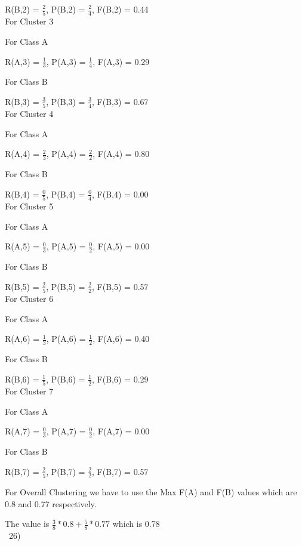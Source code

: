 \documentclass[12pt,english]{article}
\begin{document}
R(B,2) = $\frac{2}{5}$, P(B,2) = $\frac{2}{4}$, F(B,2) = 0.44\\
For Cluster 3\par                          
For Class A\par                            
R(A,3) = $\frac{1}{3}$, P(A,3) = $\frac{1}{4}$, F(A,3) = 0.29\par
For Class B\par                            
R(B,3) = $\frac{3}{5}$, P(B,3) = $\frac{3}{4}$, F(B,3) = 0.67\\
For Cluster 4\par                          
For Class A\par                            
R(A,4) = $\frac{2}{3}$, P(A,4) = $\frac{2}{2}$, F(A,4) = 0.80\par
For Class B\par                            
R(B,4) = $\frac{0}{5}$, P(B,4) = $\frac{0}{4}$, F(B,4) = 0.00\\
For Cluster 5\par                          
For Class A\par                            
R(A,5) = $\frac{0}{3}$, P(A,5) = $\frac{0}{2}$, F(A,5) = 0.00\par
For Class B\par                            
R(B,5) = $\frac{2}{5}$, P(B,5) = $\frac{2}{2}$, F(B,5) = 0.57\\
For Cluster 6\par                          
For Class A\par                            
R(A,6) = $\frac{1}{3}$, P(A,6) = $\frac{1}{2}$, F(A,6) = 0.40\par
For Class B\par                            
R(B,6) = $\frac{1}{5}$, P(B,6) = $\frac{1}{2}$, F(B,6) = 0.29\\
For Cluster 7\par                          
For Class A\par                            
R(A,7) = $\frac{0}{3}$, P(A,7) = $\frac{0}{2}$, F(A,7) = 0.00\par
For Class B\par                            
R(B,7) = $\frac{2}{5}$, P(B,7) = $\frac{2}{2}$, F(B,7) = 0.57\par
For Overall Clustering we have to use the Max F(A) and F(B) values which are 0.8 and 0.77 respectively.\par
The value is $\frac{3}{8} * 0.8 +\frac{5}{8} * 0.77$ which is 0.78\\\
26)\\
\end{document}
